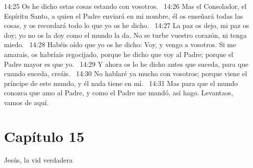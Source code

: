14:25 Os he dicho estas cosas estando con vosotros.  
14:26 Mas el Consolador, el Espíritu Santo, a quien el Padre enviará en mi nombre, él os enseñará todas las cosas, y os recordará todo lo que yo os he dicho.  
14:27 La paz os dejo, mi paz os doy; yo no os la doy como el mundo la da. No se turbe vuestro corazón, ni tenga miedo.  
14:28 Habéis oído que yo os he dicho: Voy, y vengo a vosotros. Si me amarais, os habríais regocijado, porque he dicho que voy al Padre; porque el Padre mayor es que yo.  
14:29 Y ahora os lo he dicho antes que suceda, para que cuando suceda, creáis.  
14:30 No hablaré ya mucho con vosotros; porque viene el príncipe de este mundo, y él nada tiene en mí.  
14:31 Mas para que el mundo conozca que amo al Padre, y como el Padre me mandó, así hago. Levantaos, vamos de aquí.  
\section*{Capítulo 15}
Jesús, la vid verdadera  

